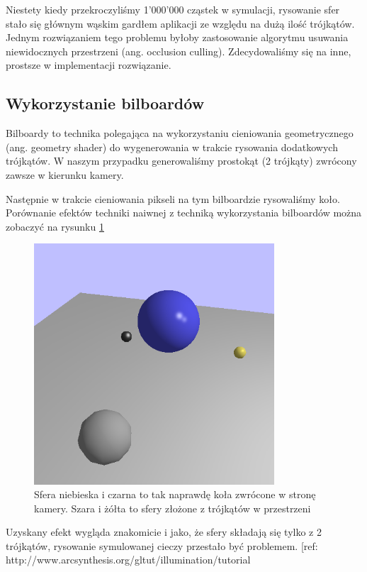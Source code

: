 \documentclass[polish, 12pt]{aghthesis}
\begin{document}
		Niestety kiedy przekroczyliśmy 1'000'000 cząstek w symulacji, rysowanie sfer stało się głównym wąskim gardłem aplikacji ze względu na dużą ilość trójkątów. Jednym rozwiązaniem tego problemu byłoby zastosowanie algorytmu usuwania niewidocznych przestrzeni (ang. occlusion culling). Zdecydowaliśmy się na inne, prostsze w implementacji rozwiązanie.
		
	\subsection{Wykorzystanie bilboardów}
		Bilboardy to technika polegająca na wykorzystaniu cieniowania geometrycznego (ang. geometry shader) do wygenerowania w trakcie rysowania dodatkowych trójkątów. W naszym przypadku generowaliśmy prostokąt (2 trójkąty) zwrócony zawsze w kierunku kamery. 
		
		Następnie w trakcie cieniowania pikseli na tym bilboardzie rysowaliśmy koło. Porównanie efektów techniki naiwnej z techniką wykorzystania bilboardów można zobaczyć na rysunku \ref{fig:impostor_image}
		
		\begin{figure}[h!]
    	\centering
    	\includegraphics[width=0.8\textwidth]{impostor.png}
    	\caption{Sfera niebieska i czarna to tak naprawdę koła zwrócone w stronę kamery. Szara i żółta to sfery złożone z trójkątów w przestrzeni}
    	\label{fig:impostor_image}
		\end{figure}
		
		Uzyskany efekt wygląda znakomicie i jako, że sfery składają się tylko z 2 trójkątów, rysowanie symulowanej cieczy przestało być problemem. [ref: http://www.arcsynthesis.org/gltut/illumination/tutorial%
		
\end{document}
